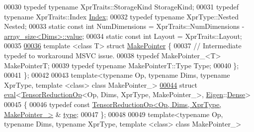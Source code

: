 \begin{DoxyCode}
00030   \textcolor{keyword}{typedef} \textcolor{keyword}{typename} XprTraits::StorageKind StorageKind;
00031   \textcolor{keyword}{typedef} \textcolor{keyword}{typename} XprTraits::Index \hyperlink{namespace_eigen_a62e77e0933482dafde8fe197d9a2cfde}{Index};
00032   \textcolor{keyword}{typedef} \textcolor{keyword}{typename} XprType::Nested Nested;
00033   \textcolor{keyword}{static} \textcolor{keyword}{const} \textcolor{keywordtype}{int} NumDimensions = XprTraits::NumDimensions - 
      \hyperlink{struct_eigen_1_1internal_1_1array__size}{array\_size<Dims>::value};
00034   \textcolor{keyword}{static} \textcolor{keyword}{const} \textcolor{keywordtype}{int} Layout = XprTraits::Layout;
00035 
\hyperlink{struct_eigen_1_1internal_1_1traits_3_01_tensor_reduction_op_3_01_op_00_01_dims_00_01_xpr_type_00c39382462f4a2e2ae6af6fe0f8aab669}{00036}   \textcolor{keyword}{template} <\textcolor{keyword}{class} T> \textcolor{keyword}{struct }\hyperlink{struct_eigen_1_1_make_pointer}{MakePointer} \{
00037     \textcolor{comment}{// Intermediate typedef to workaround MSVC issue.}
00038     \textcolor{keyword}{typedef} MakePointer\_<T> MakePointerT;
00039     \textcolor{keyword}{typedef} \textcolor{keyword}{typename} MakePointerT::Type Type;
00040   \};
00041 \};
00042 
00043 \textcolor{keyword}{template}<\textcolor{keyword}{typename} Op, \textcolor{keyword}{typename} Dims, \textcolor{keyword}{typename} XprType, \textcolor{keyword}{template} <\textcolor{keyword}{class}> \textcolor{keyword}{class }MakePointer\_>
\hyperlink{struct_eigen_1_1internal_1_1eval_3_01_tensor_reduction_op_3_01_op_00_01_dims_00_01_xpr_type_00_00c091111a76ab7a3f6cf062dd12dd3c4}{00044} \textcolor{keyword}{struct }\hyperlink{struct_eigen_1_1internal_1_1eval}{eval}<\hyperlink{class_eigen_1_1_tensor_reduction_op}{TensorReductionOp}<Op, Dims, XprType, MakePointer\_>, 
      \hyperlink{namespace_eigen}{Eigen}::\hyperlink{struct_eigen_1_1_dense}{Dense}>
00045 \{
00046   \textcolor{keyword}{typedef} \textcolor{keyword}{const} \hyperlink{class_eigen_1_1_tensor_reduction_op}{TensorReductionOp<Op, Dims, XprType, MakePointer\_>}
      & \hyperlink{class_eigen_1_1_tensor_reduction_op}{type};
00047 \};
00048 
00049 \textcolor{keyword}{template}<\textcolor{keyword}{typename} Op, \textcolor{keyword}{typename} Dims, \textcolor{keyword}{typename} XprType, \textcolor{keyword}{template} <\textcolor{keyword}{class}> \textcolor{keyword}{class }MakePointer\_>

\end{DoxyCode}

